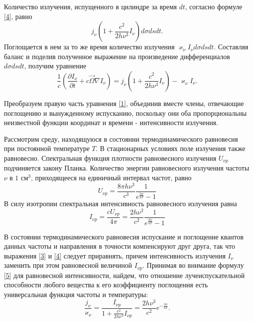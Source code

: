 Количество излучения, испущенного в цилиндре за время $dt$, согласно формуле \eqref{4}, равно
\begin {equation}
j_{\nu}\left(1 + \frac {c^2}{2h\nu^3}I_{\nu}\right)d\sigma ds dt.
\end {equation}
Поглощается в нем за то же время количество излучения $\varkappa_{\nu} I_{\nu}d\sigma dsdt$. Составляя баланс и поделив полученное выражение на произведение дифференциалов $d\sigma dsdt$, получим уравнение
\begin {equation}
\frac{1}{c} \left(\frac{\partial I_{\nu}}{\partial t} + c \vec \Omega \nabla I_{\nu}\right) = j_{\nu} \left(1 + \frac {c^2}{2h\nu^3}I_{\nu}\right) - \varkappa_{\nu}I_{\nu}.
\label{1}
\end {equation}

Преобразуем правую часть уравнения \eqref{1}, объединив вместе члены, отвечающие поглощению и вынужденному испусканию, поскольку они оба пропорциональны неизвестной функции координат и времени - интенсивности излучения. 

Рассмотрим среду, находящуюся в состоянии термодинамического равновесия при постоянной температуре $T$. В стационарных условиях поле излучения также равновесно. Спектральная функция плотности равновесного излучения $U_{\nu p}$ подчиняется закону Планка. Количество энергии равновесного излучения частоты $\nu$ в $1 \text{ см}^3$, приходящееся на единичный интервал частот, равно
\begin {equation}
U_{\nu p} = \frac{8 \pi h \nu^3}{c^3} \frac {1}{e^{\frac{h\nu}{kT}} - 1}
\end {equation}
В силу изотропии спектральная интенсивность равновесного излучения равна
\begin {equation}
I_{\nu p} = \frac{cU_{\nu p}}{4\pi} = \frac{2h\nu^3}{c^2}\frac{1}{e^{\frac{h\nu}{kT}} - 1}
\label{5}
\end {equation}

В состоянии термодинамического равновесия испускание и поглощение квантов данных частоты и направления в точности компенсируют друг друга, так что выражения \eqref{3} и \eqref{4} следует приравнять, причем интенсивность излучения $I_{\nu}$ заменить при этом равновесной величиной $I_{\nu p}$. 
Принимая во внимание формулу \eqref{5} для равновесной интенсивности, найдем, что отношение лучеиспускательной способности любого вещества к его коэффициенту поглощения есть универсальная функция частоты и температуры:
\begin {equation}
\frac{j_{\nu}}{\varkappa_{\nu}} =  \frac{I_{\nu p}}{1+\frac{c^2}{2h\nu^3}I_{\nu p}} = \frac{2h\nu^3}{c^2}e^{-\frac{h\nu}{kT}}.
\label{6}
\end {equation}

